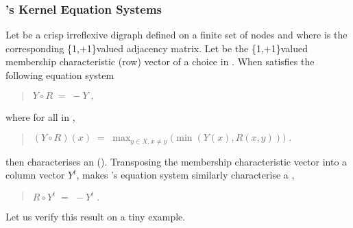 \documentclass[a4paper,10pt,english]{sphinxhowto}
\begin{document}
\subsubsection{’s Kernel Equation Systems}
\label{\detokenize{tutorial:claude-berge-s-kernel-equation-systems}}
Let  be a crisp irreflexive digraph defined on a finite set  of nodes and where  is the corresponding \{\sphinxhyphen{}1,+1\}\sphinxhyphen{}valued adjacency matrix. Let  be the \{\sphinxhyphen{}1,+1\}\sphinxhyphen{}valued membership characteristic (row) vector of a choice in . When  satisfies the following equation system
\begin{quote}

\(Y \circ R \; = \; -Y\;,\)
\end{quote}

where for all  in ,
\begin{quote}

\((Y \circ R)(x) \; = \; \max_{y \in X, x \neq y} \big ( \min(Y(x), R(x,y))\big)\;.\)
\end{quote}

then  characterises an  (). Transposing the membership characteristic vector into a column vector \(Y^t\), makes ’s equation system similarly characterise a ,
\begin{quote}

\(R \circ Y^t \; = \; -Y^t\;.\)
\end{quote}

Let us verify this result on a tiny example.
\end{document}
